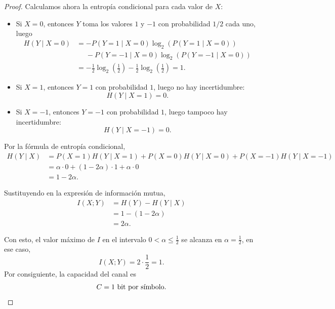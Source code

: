 \documentclass[a4,10pt]{aleph-notas}
\begin{document}
\begin{proof}
Calculamos ahora la entropía condicional para cada valor de \(X\):
\begin{itemize}
    \item Si \(X=0\), entonces \(Y\) toma los valores \(1\) y \(-1\) con probabilidad \(1/2\) cada uno, luego
    \begin{align*}
    H(Y\mid X=0)
        &= - P(Y=1\mid X=0)\log_2\left( P(Y=1\mid X=0)\right) \\
        & \phantom{=}- P(Y=-1\mid X=0)\log_2\left( P(Y=-1\mid X=0) \right)\\
        &= - \frac{1}{2}\log_2\left(\frac{1}{2}\right) 
        - \frac{1}{2}\log_2\left(\frac{1}{2}\right) = 1.
    \end{align*}
    \item Si \(X=1\), entonces \(Y=1\) con probabilidad \(1\), luego no hay incertidumbre:
    \[
        H(Y\mid X=1)=0.
    \]
    \item Si \(X=-1\), entonces \(Y=-1\) con probabilidad \(1\), luego tampoco hay incertidumbre:
    \[
        H(Y\mid X=-1)=0.
    \]

\end{itemize}

Por la fórmula de entropía condicional,
\begin{align*}
    H(Y\mid X)
        &=P(X=1)H(Y\mid X=1)+P(X=0)H(Y\mid X=0)+P(X=-1)H(Y\mid X=-1)\\
        &=\alpha\cdot 0+(1-2\alpha)\cdot 1+\alpha\cdot 0\\
        &=1-2\alpha.
\end{align*}

Sustituyendo en la expresión de información mutua,
\begin{align*}
    I(X;Y)
        &=H(Y)-H(Y\mid X)\\
        &=1-(1-2\alpha)\\
        &=2\alpha.
\end{align*}

Con esto, el valor máximo de $I$ en el intervalo \(0<\alpha\le \frac{1}{2}\) se alcanza en $\alpha=\frac{1}{2}$, en ese caso,
\[
    I(X;Y)=2\cdot \frac{1}{2}=1.
\]
Por consiguiente, la capacidad del canal es
\[
    C=1\text{ bit por símbolo}.\qedhere
\]
\end{proof}
\end{document}
